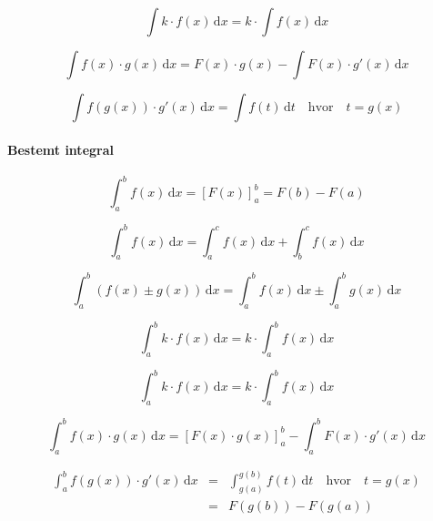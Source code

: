 \documentclass[11pt,a4paper,landscape,twocolumn,fleqn,leqno]{article}
\begin{document}
\begin{equation}
\int k \cdot f(x)\, \mathrm{d}x = k \cdot \int f(x)\, \mathrm{d}x
\end{equation}

\begin{equation}
\int f(x) \cdot g(x)\, \mathrm{d}x = F(x) \cdot g(x) -  \int F(x) \cdot g'(x)\, \mathrm{d}x
\end{equation}

\begin{equation}
\int f(g(x)) \cdot g'(x)\, \mathrm{d}x = \int f(t)\, \mathrm{d}t \quad \mbox{hvor} \quad t = g(x)
\end{equation}

\paragraph{Bestemt integral}

\begin{equation}
\int_a^b f(x)\, \mathrm{d}x = \left[F(x)\right]_a^b = F(b) - F(a)
\end{equation}

\begin{equation}
\int_a^b f(x)\, \mathrm{d}x = \int_a^c f(x)\, \mathrm{d}x + \int_b^c f(x)\, \mathrm{d}x
\end{equation}

\begin{equation}
\int_a^b \left(f(x) \pm g(x)\right)\, \mathrm{d}x = \int_a^b f(x)\, \mathrm{d}x \pm \int_a^b g(x)\, \mathrm{d}x
\end{equation}

\begin{equation}
\int_a^b k \cdot f(x)\, \mathrm{d}x = k \cdot \int_a^b f(x)\, \mathrm{d}x
\end{equation}

\begin{equation}
\int_a^b k \cdot f(x)\, \mathrm{d}x = k \cdot \int_a^b f(x)\, \mathrm{d}x
\end{equation}

\begin{equation}
\int_a^b f(x) \cdot g(x)\, \mathrm{d}x = \left[F(x) \cdot g(x) \right]_a^b - \int_a^b F(x) \cdot g'(x)\, \mathrm{d}x
\end{equation}

\begin{eqnarray}
\int_a^b f(g(x)) \cdot g'(x)\, \mathrm{d}x & = & \int_{g(a)}^{g(b)} f(t)\, \mathrm{d}t  \quad \mbox{hvor} \quad t = g(x) \\
 & = & F(g(b)) - F(g(a)) \nonumber
\end{eqnarray}
\end{document}
